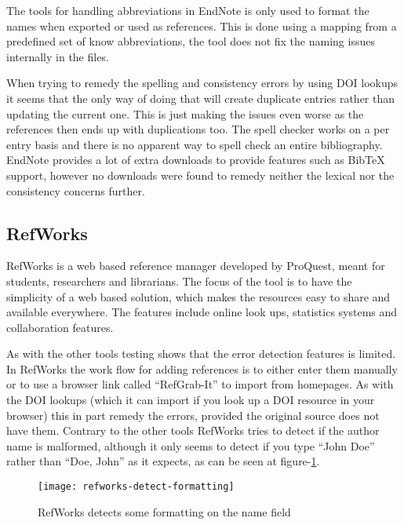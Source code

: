The tools for handling abbreviations in EndNote is only used to format
the names when exported or used as references.  This is done using a
mapping from a predefined set of know abbreviations, the tool does not
fix the naming issues internally in the
files\cite{endnote_terms_journals}.

When trying to remedy the spelling and consistency errors by using DOI
lookups it seems that the only way of doing that will create duplicate
entries rather than updating the current one. This is just making the
issues even worse as the references then ends up with duplications
too.  The spell checker works on a per entry basis and there is no
apparent way to spell check an entire bibliography.  EndNote provides
a lot of extra downloads to provide features such as Bib{\TeX}
support, however no downloads were found to remedy neither the lexical
nor the consistency concerns further\cite{endnote_downloads}.

\subsection{RefWorks}
RefWorks is a web based reference manager developed by ProQuest, meant
for students, researchers and librarians.  The focus of the tool is to
have the simplicity of a web based solution, which makes the resources
easy to share and available everywhere.  The features include online
look ups, statistics systems and collaboration
features\cite{refworks_features}.

As with the other tools testing shows that the error detection
features is limited.  In RefWorks the work flow for adding references
is to either enter them manually or to use a browser link called
``RefGrab-It'' to import from homepages.  As with the DOI lookups
(which it can import if you look up a DOI resource in your browser)
this in part remedy the errors, provided the original source does not
have them.  Contrary to the other tools RefWorks tries to detect if
the author name is malformed, although it only seems to detect if you
type ``John Doe'' rather than ``Doe, John'' as it expects, as can be
seen at figure-\ref{fig:refworks-detect-formatting}.

\begin{figure}[ht]
    \centering
    \texttt{[image: refworks-detect-formatting]}
    \caption{RefWorks detects some formatting on the name field}
    \label{fig:refworks-detect-formatting}
\end{figure}

